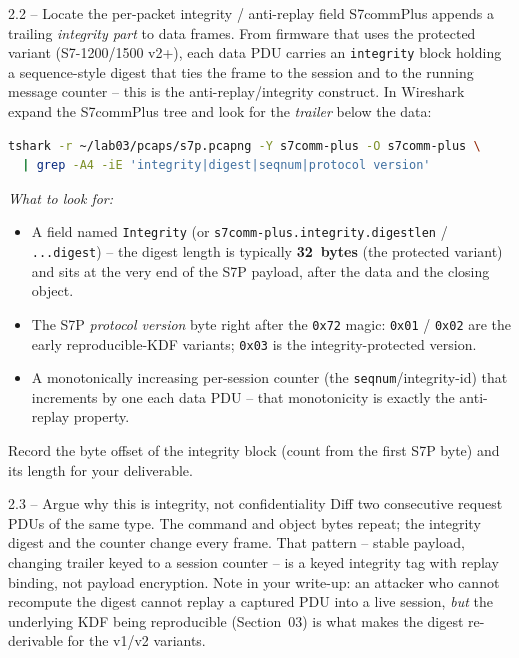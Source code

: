 \documentclass[11pt,a4paper]{article}
\begin{document}
\begin{stepbox}{2.2 -- Locate the per-packet integrity / anti-replay field}
S7commPlus appends a trailing \emph{integrity part} to data frames. From
firmware that uses the protected variant (S7-1200/1500 v2+), each data
PDU carries an \texttt{integrity} block holding a sequence-style digest
that ties the frame to the session and to the running message counter --
this is the anti-replay/integrity construct. In Wireshark expand the
S7commPlus tree and look for the \emph{trailer} below the data:
\begin{lstlisting}[language=bash]
tshark -r ~/lab03/pcaps/s7p.pcapng -Y s7comm-plus -O s7comm-plus \
  | grep -A4 -iE 'integrity|digest|seqnum|protocol version'
\end{lstlisting}
\emph{What to look for:}
\begin{itemize}[leftmargin=*, nosep]
  \item A field named \texttt{Integrity} (or
        \texttt{s7comm-plus.integrity.digestlen} /
        \texttt{...digest}) -- the digest length is typically
        \textbf{32~bytes} (the protected variant) and sits at the very end
        of the S7P payload, after the data and the closing object.
  \item The S7P \emph{protocol version} byte right after the \texttt{0x72}
        magic: \texttt{0x01} / \texttt{0x02} are the early reproducible-KDF
        variants; \texttt{0x03} is the integrity-protected version.
  \item A monotonically increasing per-session counter (the
        \texttt{seqnum}/integrity-id) that increments by one each data PDU
        -- that monotonicity is exactly the anti-replay property.
\end{itemize}
Record the byte offset of the integrity block (count from the first S7P
byte) and its length for your deliverable.
\end{stepbox}

\begin{stepbox}{2.3 -- Argue why this is integrity, not confidentiality}
Diff two consecutive request PDUs of the same type. The command and
object bytes repeat; the integrity digest and the counter change every
frame. That pattern -- stable payload, changing trailer keyed to a
session counter -- is a keyed integrity tag with replay binding, not
payload encryption. Note in your write-up: an attacker who cannot
recompute the digest cannot replay a captured PDU into a live session,
\emph{but} the underlying KDF being reproducible (Section~03) is what makes
the digest re-derivable for the v1/v2 variants.
\end{stepbox}
\end{document}
